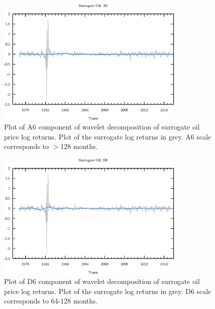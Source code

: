 \begin{figure}
\begin{center}
\includegraphics[width=0.8\textwidth]{./code/plot/surrogate_oil_wr_A6.eps}
\caption{Plot of A6 component of wavelet decomposition of surrogate oil price log returns. 
	Plot of the surrogate log returns in grey. A6 scale corresponds to $>$128 months.}
\end{center}
\label{fig:s-oil-wr-a6}
\end{figure}

\begin{figure}
\begin{center}
\includegraphics[width=0.8\textwidth]{./code/plot/surrogate_oil_wr_D6.eps}
\caption{Plot of D6 component of wavelet decomposition of surrogate oil price log returns. 
	Plot of the surrogate log returns in grey. D6 scale corresponds to 64-128 months.}
\end{center}
\label{fig:s-oil-wr-d6}
\end{figure}

